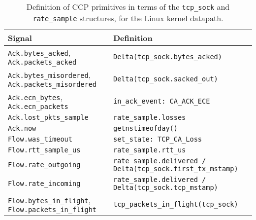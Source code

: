 \begin{table}
    \centering
    \footnotesize
    \begin{tabular}{p{}p{}}
        \textbf{Signal} & \textbf{Definition} \\
        \hline
        \texttt{Ack.bytes\_acked}, \texttt{Ack.packets\_acked}             & \texttt{Delta(tcp\_sock.bytes\_acked)} \\
        \texttt{Ack.bytes\_misordered}, \texttt{Ack.packets\_misordered}   & \texttt{Delta(tcp\_sock.sacked\_out)} \\
        \texttt{Ack.ecn\_bytes}, \texttt{Ack.ecn\_packets}                 & \texttt{in\_ack\_event: CA\_ACK\_ECE} \\
        \texttt{Ack.lost\_pkts\_sample}                                    & \texttt{rate\_sample.losses} \\
        \texttt{Ack.now}                                                   & \texttt{getnstimeofday()}\\
        \texttt{Flow.was\_timeout}                                         & \texttt{set\_state: TCP\_CA\_Loss} \\
        \texttt{Flow.rtt\_sample\_us}                                      & \texttt{rate\_sample.rtt\_us} \\
        \texttt{Flow.rate\_outgoing}                                       & \texttt{rate\_sample.delivered / Delta(tcp\_sock.first\_tx\_mstamp)} \\
        \texttt{Flow.rate\_incoming}                                       & \texttt{rate\_sample.delivered / Delta(tcp\_sock.tcp\_mstamp)}  \\
        \texttt{Flow.bytes\_in\_flight}, \texttt{Flow.packets\_in\_flight} & \texttt{tcp\_packets\_in\_flight(tcp\_sock)} \\
    \end{tabular}
    \caption{Definition of CCP primitives in terms of the \texttt{tcp\_sock} and \texttt{rate\_sample} structures, for the Linux kernel datapath.}\label{tab:api:kernel}
\end{table}